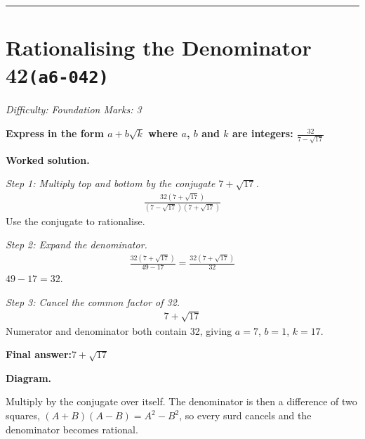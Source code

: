 \documentclass[11pt]{article}
\newcommand{\question}[1]{\par\medskip\noindent\textbf{#1}\par}
\begin{document}
\medskip\hrule

\section*{Rationalising the Denominator 42\quad\small\texttt{(a6-042)}}
\textit{Difficulty: Foundation \quad\textbar\quad Marks: 3}

\question{Express in the form \( a + b\sqrt{k} \) where \( a \), \( b \) and \( k \) are integers: \( \frac{32}{7 - \sqrt{17}} \)}

\textbf{Worked solution.}

\textit{Step 1: Multiply top and bottom by the conjugate \( 7 + \sqrt{17} \).}
\[\begin{gathered}
\frac{32(7 + \sqrt{17})}{(7 - \sqrt{17})(7 + \sqrt{17})}
\end{gathered}\]
Use the conjugate to rationalise.

\textit{Step 2: Expand the denominator.}
\[\begin{gathered}
\frac{32(7 + \sqrt{17})}{49 - 17} = \frac{32(7 + \sqrt{17})}{32}
\end{gathered}\]
\( 49 - 17 = 32 \).

\textit{Step 3: Cancel the common factor of 32.}
\[\begin{gathered}
7 + \sqrt{17}
\end{gathered}\]
Numerator and denominator both contain 32, giving \( a = 7 \), \( b = 1 \), \( k = 17 \).

\begin{answerbox}
\textbf{Final answer:}\quad \(\displaystyle 7 + \sqrt{17}\)
\end{answerbox}
\textbf{Diagram.}

\begin{center}
\end{center}
\small Multiply by the conjugate over itself. The denominator is then a difference of two squares, $(A+B)(A-B)=A^{2}-B^{2}$, so every surd cancels and the denominator becomes rational.\normalsize
\end{document}
